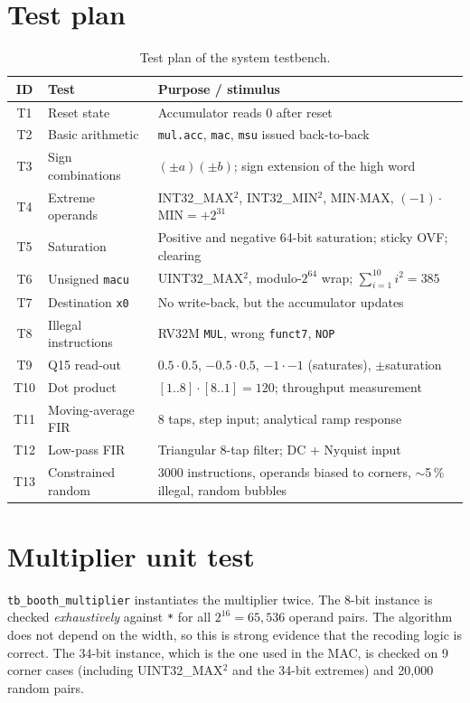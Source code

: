 \documentclass[11pt,a4paper]{report}
\newcommand{\code}[1]{\texttt{#1}}
\begin{document}
\section{Test plan}
\begin{table}[H]
  \centering
  \caption{Test plan of the system testbench.}
  \label{tab:testplan}
  \small
  \begin{tabularx}{\linewidth}{@{}clX@{}}
    \toprule
    ID & Test & Purpose / stimulus \\
    \midrule
    T1  & Reset state & Accumulator reads 0 after reset \\
    T2  & Basic arithmetic & \code{mul.acc}, \code{mac}, \code{msu} issued back-to-back \\
    T3  & Sign combinations & $(\pm a)(\pm b)$; sign extension of the high word \\
    T4  & Extreme operands & INT32\_MAX$^2$, INT32\_MIN$^2$, MIN$\cdot$MAX, $(-1)\cdot$MIN$=+2^{31}$ \\
    T5  & Saturation & Positive and negative 64-bit saturation; sticky OVF; clearing \\
    T6  & Unsigned \code{macu} & UINT32\_MAX$^2$, modulo-$2^{64}$ wrap; $\sum_{i=1}^{10} i^2=385$ \\
    T7  & Destination \code{x0} & No write-back, but the accumulator updates \\
    T8  & Illegal instructions & RV32M \code{MUL}, wrong \code{funct7}, \code{NOP} \\
    T9  & Q15 read-out & $0.5\cdot0.5$, $-0.5\cdot0.5$, $-1\cdot-1$ (saturates), $\pm$saturation \\
    T10 & Dot product & $[1..8]\cdot[8..1]=120$; throughput measurement \\
    T11 & Moving-average FIR & 8 taps, step input; analytical ramp response \\
    T12 & Low-pass FIR & Triangular 8-tap filter; DC + Nyquist input \\
    T13 & Constrained random & 3000 instructions, operands biased to corners, $\sim$5\,\% illegal, random bubbles \\
    \bottomrule
  \end{tabularx}
\end{table}

\section{Multiplier unit test}
\code{tb\_booth\_multiplier} instantiates the multiplier twice. The 8-bit
instance is checked \emph{exhaustively} against \code{*} for all
$2^{16}=65{,}536$ operand pairs. The algorithm does not depend on the width,
so this is strong evidence that the recoding logic is correct. The 34-bit
instance, which is the one used in the MAC, is checked on 9 corner cases
(including UINT32\_MAX$^2$ and the 34-bit extremes) and 20{,}000 random pairs.
\end{document}
